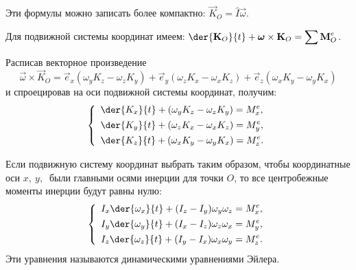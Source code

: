 Эти формулы можно записать более компактно: \( \vec{K}_O = \hat{I}\vec{\omega} \).

Для подвижной системы координат имеем: \( \ds \der{\vec{K}_O}{t} + \vec{\omega}
\times\vec{K}_O = \sum \vec{M}^e_O \).

Расписав векторное произведение
\[
    \vec{\omega}\times\vec{K}_O = \vec{e}_x(\omega_y K_z - \omega_z K_y) +
    \vec{e}_y(\omega_z K_x - \omega_x K_z) + \vec{e}_z(\omega_x K_y -
    \omega_y K_x)
\]
и спроецировав на оси подвижной системы координат, получим:
\[
    \left\{ \begin{array}{l}
        \ds \der{K_x}{t} + (\omega_y K_z - \omega_z K_y) = M^e_x, \\[.4em]
        \ds \der{K_y}{t} + (\omega_z K_x - \omega_x K_z) = M^e_y, \\[.4em]
        \ds \der{K_z}{t} + (\omega_x K_y - \omega_y K_x) = M^e_z.
    \end{array} \right.
\]

Если подвижную систему координат выбрать таким образом, чтобы координатные оси
\( x,\ y,\ \) были главными осями инерции для точки \( O \), то все центробежные
моменты инерции будут равны нулю:
\[
    \left\{ \begin{array}{l}
        \ds I_x\der{\omega_x}{t} + (I_z -  I_y)\omega_y\omega_z = M^e_x, \\[.4em]
        \ds I_y\der{\omega_y}{t} + (I_x -  I_z)\omega_z\omega_x = M^e_y, \\[.4em]
        \ds I_z\der{\omega_z}{t} + (I_y -  I_x)\omega_x\omega_y = M^e_z.
    \end{array} \right.
\] 
Эти уравнения называются динамическими уравнениями Эйлера.

\newpage
